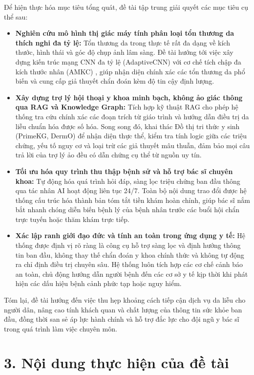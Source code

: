 Để hiện thực hóa mục tiêu tổng quát, đề tài tập trung giải quyết các mục tiêu cụ thể sau:
\begin{itemize}
  \item \textbf{Nghiên cứu mô hình thị giác máy tính phân loại tổn thương da thích nghi đa tỷ lệ:} Tổn thương da trong thực tế rất đa dạng về kích thước, hình thái và góc độ chụp ảnh lâm sàng. Đề tài hướng tới việc xây dựng kiến trúc mạng CNN đa tỷ lệ (AdaptiveCNN) với cơ chế tích chập đa kích thước nhân (AMKC) , giúp nhận diện chính xác các tổn thương da phổ biến và cung cấp giả thuyết chẩn đoán kèm độ tin cậy định lượng.
  \item \textbf{Xây dựng trợ lý hội thoại y khoa minh bạch, không ảo giác thông qua RAG và Knowledge Graph:} Tích hợp kỹ thuật RAG cho phép hệ thống tra cứu chính xác các đoạn trích từ giáo trình và hướng dẫn điều trị da liễu chuẩn hóa được số hóa. Song song đó, khai thác Đồ thị tri thức y sinh (PrimeKG, DermO) để nhận diện thực thể, kiểm tra tính logic giữa các triệu chứng, yếu tố nguy cơ và loại trừ các giả thuyết mâu thuẫn, đảm bảo mọi câu trả lời của trợ lý ảo đều có dẫn chứng cụ thể từ nguồn uy tín.
  \item \textbf{Tối ưu hóa quy trình thu thập bệnh sử và hỗ trợ bác sĩ chuyên khoa:} Tự động hóa quá trình hỏi đáp, sàng lọc triệu chứng ban đầu thông qua tác nhân AI hoạt động liên tục 24/7. Toàn bộ nội dung trao đổi được hệ thống cấu trúc hóa thành bản tóm tắt tiền khám hoàn chỉnh, giúp bác sĩ nắm bắt nhanh chóng diễn biến bệnh lý của bệnh nhân trước các buổi hội chẩn trực tuyến hoặc thăm khám trực tiếp.
  \item \textbf{Xác lập ranh giới đạo đức và tính an toàn trong ứng dụng y tế:} Hệ thống được định vị rõ ràng là công cụ hỗ trợ sàng lọc và định hướng thông tin ban đầu, không thay thế chẩn đoán y khoa chính thức và không tự động ra chỉ định điều trị chuyên sâu. Hệ thống luôn tích hợp các cơ chế cảnh báo an toàn, chủ động hướng dẫn người bệnh đến các cơ sở y tế kịp thời khi phát hiện các dấu hiệu bệnh cảnh phức tạp hoặc nguy hiểm.
\end{itemize}

Tóm lại, đề tài hướng đến việc thu hẹp khoảng cách tiếp cận dịch vụ da liễu cho người dân, nâng cao tính khách quan và chất lượng của thông tin sức khỏe ban đầu, đồng thời san sẻ áp lực hành chính và hỗ trợ đắc lực cho đội ngũ y bác sĩ trong quá trình làm việc chuyên môn.

\section*{3. Nội dung thực hiện của đề tài}

